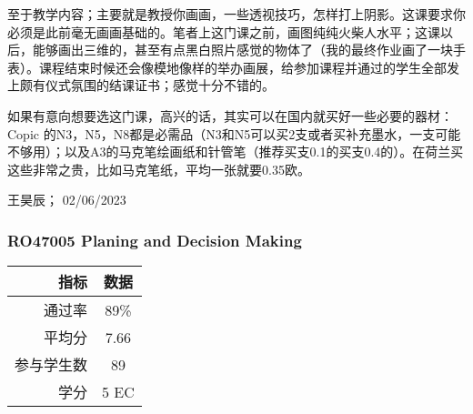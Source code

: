 至于教学内容；主要就是教授你画画，一些透视技巧，怎样打上阴影。这课要求你必须是此前毫无画画基础的。笔者上这门课之前，画图纯纯火柴人水平；这课以后，能够画出三维的，甚至有点黑白照片感觉的物体了（我的最终作业画了一块手表）。课程结束时候还会像模地像样的举办画展，给参加课程并通过的学生全部发上颇有仪式氛围的结课证书；感觉十分不错的。

如果有意向想要选这门课，高兴的话，其实可以在国内就买好一些必要的器材：Copic 的N3，N5，N8都是必需品（N3和N5可以买2支或者买补充墨水，一支可能不够用）；以及A3的马克笔绘画纸和针管笔（推荐买支0.1的买支0.4的）。在荷兰买这些非常之贵，比如马克笔纸，平均一张就要0.35欧。
\begin{flushright}
王昊辰； 02/06/2023
\end{flushright}

\subsubsection{RO47005 Planing and Decision Making}
\begin{minipage}{0.45\textwidth}
\centering
{}
\end{minipage}%
\begin{minipage}{0.45\textwidth}
\raggedleft
\begin{tabular}{r|c}
\textbf{指标} & \textbf{数据} \\ \hline
通过率 & 89\% \\ 
平均分 & 7.66 \\ 
参与学生数 & 89 \\ 
学分 & 5 EC\\
\end{tabular}
\end{minipage}\\

